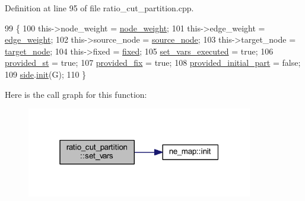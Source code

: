 Definition at line 95 of file ratio\+\_\+cut\+\_\+partition.\+cpp.


\begin{DoxyCode}
99 \{
100     this->node\_weight = \mbox{\hyperlink{classratio__cut__partition_a4d9d2a9317a062f839ea7155c37b173f}{node\_weight}};
101     this->edge\_weight = \mbox{\hyperlink{classratio__cut__partition_a48a85c82fb09b83c9d494d6d1232fab2}{edge\_weight}};
102     this->source\_node = \mbox{\hyperlink{classratio__cut__partition_abb18c3acafc590e258453d7a8d86bb49}{source\_node}};
103     this->target\_node = \mbox{\hyperlink{classratio__cut__partition_a343ba76869e64141fb795010e388744b}{target\_node}};
104     this->fixed = \mbox{\hyperlink{classratio__cut__partition_ad77023b9f60e88274bf54f2019404768}{fixed}};
105     \mbox{\hyperlink{classratio__cut__partition_aa722d032cb59664894c6301ceee86729}{set\_vars\_executed}} = \textcolor{keyword}{true};
106     \mbox{\hyperlink{classratio__cut__partition_a248512624766f0b21d154b4841c95a1d}{provided\_st}} = \textcolor{keyword}{true};
107     \mbox{\hyperlink{classratio__cut__partition_a5f1f85feae589f7d39da48a412c90376}{provided\_fix}} = \textcolor{keyword}{true};
108     \mbox{\hyperlink{classratio__cut__partition_a963258b950f7142e3cac714353b1b21e}{provided\_initial\_part}} = \textcolor{keyword}{false};
109     \mbox{\hyperlink{classratio__cut__partition_a2bf913d1d8607747885177a3b585e611}{side}}.\mbox{\hyperlink{classne__map_a4ef2ab4aebcb57a7a101975bf6a88e24}{init}}(G);
110 \}
\end{DoxyCode}
Here is the call graph for this function\+:\nopagebreak
\begin{figure}[H]
\begin{center}
\leavevmode
\includegraphics[width=280pt]{classratio__cut__partition_a2c09504b727a1b1d1e2f99a3a42de05b_cgraph}
\end{center}
\end{figure}
\mbox{\label{classratio__cut__partition_a0ed59d80c7e15d2865d6aa4657ae3f78}} 
